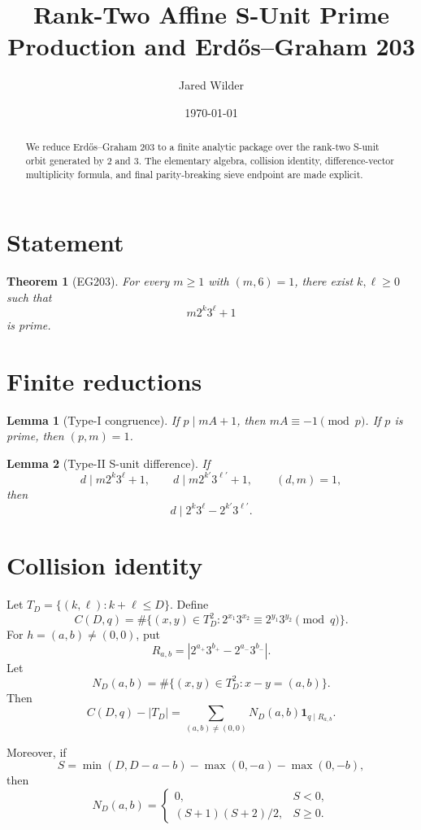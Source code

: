 \documentclass[11pt]{article}
\title{Rank-Two Affine S-Unit Prime Production and Erdős--Graham 203}
\author{Jared Wilder}
\date{\today}
\newtheorem{theorem}{Theorem}
\newtheorem{lemma}{Lemma}
\begin{document}
\maketitle

\begin{abstract}
We reduce Erdős--Graham 203 to a finite analytic package over the rank-two
S-unit orbit generated by \(2\) and \(3\).  The elementary algebra, collision
identity, difference-vector multiplicity formula, and final parity-breaking
sieve endpoint are made explicit.
\end{abstract}

\section{Statement}

\begin{theorem}[EG203]
For every \(m\ge 1\) with \((m,6)=1\), there exist \(k,\ell\ge 0\) such that
\[
m2^k3^\ell+1
\]
is prime.
\end{theorem}

\section{Finite reductions}

\begin{lemma}[Type-I congruence]
If \(p\mid mA+1\), then \(mA\equiv -1\pmod p\).  If \(p\) is prime, then
\((p,m)=1\).
\end{lemma}

\begin{lemma}[Type-II S-unit difference]
If
\[
d\mid m2^k3^\ell+1,\qquad d\mid m2^{k'}3^{\ell'}+1,\qquad (d,m)=1,
\]
then
\[
d\mid 2^k3^\ell-2^{k'}3^{\ell'}.
\]
\end{lemma}

\section{Collision identity}

Let \(T_D=\{(k,\ell):k+\ell\le D\}\).  Define
\[
C(D,q)=\#\{(x,y)\in T_D^2:2^{x_1}3^{x_2}\equiv2^{y_1}3^{y_2}\pmod q\}.
\]
For \(h=(a,b)\ne(0,0)\), put
\[
R_{a,b}=\left|2^{a_+}3^{b_+}-2^{a_-}3^{b_-}\right|.
\]
Let
\[
N_D(a,b)=\#\{(x,y)\in T_D^2:x-y=(a,b)\}.
\]
Then
\[
C(D,q)-|T_D|=\sum_{(a,b)\ne(0,0)}N_D(a,b)\mathbf 1_{q\mid R_{a,b}}.
\]

Moreover, if
\[
S=\min(D,D-a-b)-\max(0,-a)-\max(0,-b),
\]
then
\[
N_D(a,b)=
\begin{cases}
0,&S<0,\\
(S+1)(S+2)/2,&S\ge0.
\end{cases}
\]
\end{document}
